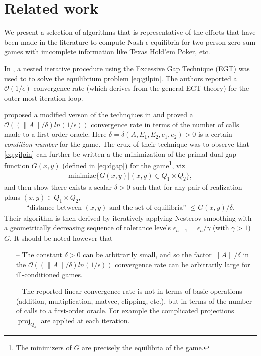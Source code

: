\documentclass{article} %
\DeclareMathOperator{\proj}{proj}
\begin{document}
\section{Related work}
\label{sec:related_work}
We present a selection of algorithms that is representative of the
efforts that have been made in the literature to compute Nash
$\epsilon$-equilibria for two-person zero-sum games with imcomplete
information like Texas Hold'em Poker, etc.


In \cite{hoda2010smoothing}, a nested iterative procedure using the
Excessive Gap Technique (EGT) \cite{nesterov2005excessive} was used to
to solve the equilibrium problem \eqref{eq:gilpin}.
The authors reported a $\mathcal{O}(1/\epsilon)$ convergence rate
(which derives from the general EGT theory) for the outer-most
iteration loop.

\cite{gilpinfirst} proposed a modified verson of the technqiues in
\cite{hoda2010smoothing} and  proved a $\mathcal{O}\left(\left(\|A\| /
\delta\right) ln\left(1 / \epsilon\right)\right)$ convergence rate in
terms of the number of calls made to a first-order oracle. Here
$\delta = \delta(A, E_1, E_2, e_1, e_2) > 0$ is a certain
\textit{condition number} for the game. The crux of their technique was to
observe that \eqref{eq:gilpin} can further be written a the minimization of
the primal-dual gap function $G(x, y)$ (defined in \eqref{eq:dgap})
for the game\footnote{The minimizers of $G$ are precisely the
  equilibria of the game.}, viz
\begin{eqnarray}
\mathrm{minimize}\{G(x,y)|(x,y) \in Q_1 \times Q_2\},
\end{eqnarray}
and then show there exists a scalar
$\delta > 0$ such that for any pair of realization plans $(x, y) \in Q_1 \times Q_2$,
\begin{eqnarray}
\text{``distance between }(x, y)\text{ and the set of
equilibria'' } \le G(x, y)/\delta.
\end{eqnarray}
Their
algorithm is then derived by iteratively applying Nesterov smoothing \cite{nesterov2005a}
with a geometrically decreasing sequence of tolerance levels
$\epsilon_{n+1} = \epsilon_n / \gamma$ (with $\gamma > 1$)  $G$. It
should be noted however that
\begin{itemize}
\item[--] The constant $\delta > 0$ can be arbitrarily small, and so
  the factor $\|A\| / \delta$ in the $\mathcal{O}\left(\left(\|A\| /
\delta\right) ln\left(1 / \epsilon\right)\right)$ convergence rate can
be arbitrarily large for ill-conditioned games.
\item[--] The reported linear convergence rate is not in terms of
  basic operations (addition, multiplication, matvec, clipping, etc.),
  but in terms of the number of calls to a first-order oracle. For
  example the complicated projections $\proj_{Q_k}$ are applied at each iteration.%

\end{itemize}
\end{document}
